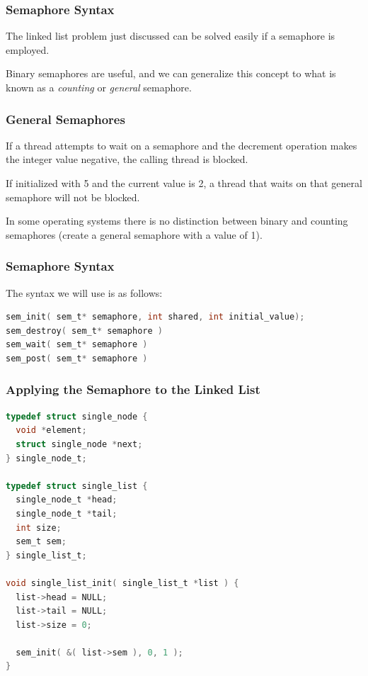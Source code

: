 \begin{frame}
\frametitle{Semaphore Syntax}

The linked list problem just discussed can be solved easily if a semaphore is employed. 

Binary semaphores are useful, and we can generalize this concept to what is known as a \textit{counting} or \textit{general} semaphore.

\end{frame}


\begin{frame}
\frametitle{General Semaphores}

If a thread attempts to wait on a semaphore and the decrement operation makes the integer value negative, the calling thread is blocked. 

If initialized with 5 and the current value is 2, a thread that waits on that general semaphore will not be blocked.

In some operating systems there is no distinction between binary and counting semaphores (create a general semaphore with a value of 1).

\end{frame}

\begin{frame}[fragile]
\frametitle{Semaphore Syntax}

The syntax we will use is as follows:

\begin{lstlisting}[language=C]
sem_init( sem_t* semaphore, int shared, int initial_value);
sem_destroy( sem_t* semaphore )
sem_wait( sem_t* semaphore )
sem_post( sem_t* semaphore )
\end{lstlisting}

\end{frame}

\begin{frame}[fragile]
\frametitle{Applying the Semaphore to the Linked List}

\begin{lstlisting}[language=C]
typedef struct single_node {
  void *element;
  struct single_node *next;
} single_node_t;

typedef struct single_list {
  single_node_t *head;
  single_node_t *tail;
  int size;
  sem_t sem;
} single_list_t;

void single_list_init( single_list_t *list ) {
  list->head = NULL;
  list->tail = NULL;
  list->size = 0;

  sem_init( &( list->sem ), 0, 1 );
}
\end{lstlisting}

\end{frame}


